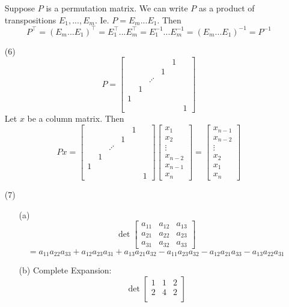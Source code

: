 \begin{itemize}
Suppose $P$ is a permutation matrix. We can write $P$ as a product of transpositions $E_1, ..., E_m$. Ie. $P = E_m...E_1$. Then 
$$P^\top = (E_m...E_1)^\top = E_1^\top...E_m^\top = E_1^{-1}...E_m^{-1} = (E_m...E_1)^{-1} = P^{-1}$$
\item[(6)]
$$P = \begin{bmatrix}
& & & & 1 &\\
& & & 1 \\
& & \iddots \\
& 1 \\
1 \\
& & & & & 1
\end{bmatrix}$$
Let $x$ be a column matrix. Then
$$Px = \begin{bmatrix}
& & & & 1 &\\
& & & 1 \\
& & \iddots \\
& 1 \\
1 \\
& & & & & 1
\end{bmatrix}\begin{bmatrix}
x_1 \\
x_2 \\
\vdots \\
x_{n-2} \\
x_{n-1} \\
x_n
\end{bmatrix} = \begin{bmatrix}
x_{n-1} \\
x_{n-2} \\
\vdots \\
x_2 \\
x_1 \\
x_n
\end{bmatrix}$$
\item[(7)]
\begin{itemize}
\item[(a)]
$$\det\begin{bmatrix}
a_{11} & a_{12} & a_{13} \\
a_{21} & a_{22} & a_{23} \\
a_{31} & a_{32} & a_{33}
\end{bmatrix}$$
$$= a_{11}a_{22}a_{33} + a_{12}a_{23}a_{31} + a_{13}a_{21}a_{32} - a_{11}a_{23}a_{32} - a_{12}a_{21}a_{33} - a_{13}a_{22}a_{31}$$
\item[(b)]
Complete Expansion:
$$\det\begin{bmatrix}
1 & 1 & 2 \\
2 & 4 & 2 \\

\end{bmatrix}$$
\end{itemize}
\end{itemize}
